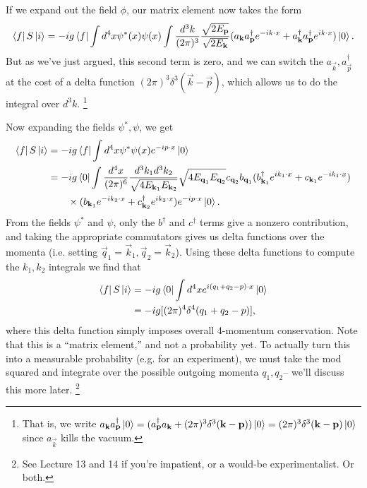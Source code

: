 If we expand out the field $\phi$, our matrix element now takes the form
\begin{equation}
    \left< f \right|S\left| i \right>=-ig \left< f \right| \int d^4x \psi^*(x) \psi(x)\int \frac{d^3k}{(2\pi)^3}\frac{\sqrt{2E_{\boldsymbol{\mathbf{p}}}}}{\sqrt{2E_{\boldsymbol{\mathbf{k}}}}}(a_{\boldsymbol{\mathbf{k}}} a_{\boldsymbol{\mathbf{p}}}^\dagger e^{-ik\cdot x}+a_{\boldsymbol{\mathbf{k}}}^\dagger a_{\boldsymbol{\mathbf{p}}}^\dagger e^{ik\cdot x})\left| 0 \right>.
\end{equation}
But as we've just argued, this second term is zero, and we can switch the $a_{\vec k}, a_{\vec p}^\dagger$ at the cost of a delta function $(2\pi)^3 \delta^3(\vec k -\vec p)$, which allows us to do the integral over $d^3k$.%
    \footnote{That is, we write $a_{\boldsymbol{\mathbf{k}}} a_{\boldsymbol{\mathbf{p}}}^\dagger \left| 0 \right>=(a_{\boldsymbol{\mathbf{p}}}^\dagger a_{\boldsymbol{\mathbf{k}}} +(2\pi)^3 \delta^3(\boldsymbol{\mathbf{k}}-\boldsymbol{\mathbf{p}}))\left| 0 \right>=(2\pi)^3 \delta^3(\boldsymbol{\mathbf{k}}-\boldsymbol{\mathbf{p}})\left| 0 \right>$ since $a_{\vec k}$ kills the vacuum.}
    
Now expanding the fields $\psi^*, \psi$, we get
\begin{align*}
    \left< f \right|S\left| i \right> &= -ig\left< f \right| \int d^4x \psi^* \psi(x)e^{-ip\cdot x}\left| 0 \right>\\
    &= -ig \left< 0 \right| \int \frac{d^4x}{(2\pi)^6} 
        \frac{d^3k_1 d^3k_2}{\sqrt{4E_{\boldsymbol{\mathbf{k}}_1}E_{\boldsymbol{\mathbf{k}}_2}}} \sqrt{4E_{\boldsymbol{\mathbf{q}}_1}E_{\boldsymbol{\mathbf{q}}_2}} c_{\boldsymbol{\mathbf{q}}_2}b_{\boldsymbol{\mathbf{q}}_1} 
        (b_{\boldsymbol{\mathbf{k}}_1}^\dagger e^{ik_1\cdot x}+c_{\boldsymbol{\mathbf{k}}_1} e^{-ik_1 \cdot x})\\
    &{} \qquad \times(b_{\boldsymbol{\mathbf{k}}_1} e^{-ik_2\cdot x}+c_{\boldsymbol{\mathbf{k}}_2}^\dagger e^{ik_2 \cdot x})e^{-ip\cdot x} \left| 0 \right>.
\end{align*}
From the fields $\psi^*$ and $\psi$, only the $b^\dagger$ and $c^\dagger$ terms give a nonzero contribution, and taking the appropriate commutators gives us delta functions over the momenta (i.e. setting $\vec q_1 = \vec k_1,\vec q_2=\vec k_2$). Using these delta functions to compute the $k_1,k_2$ integrals we find that
\begin{align*}
\left< f \right|S\left| i \right>&=-ig\left< 0 \right|\int d^4x e^{i(q_1+q_2-p)\cdot x}\left| 0 \right>\\
&=-ig[(2\pi)^4\delta^4(q_1+q_2-p)],
\end{align*}
where this delta function simply imposes overall 4-momentum conservation. Note that this is a ``matrix element,'' and not a probability yet. To actually turn this into a measurable probability (e.g. for an experiment), we must take the mod squared and integrate over the possible outgoing momenta $q_1,q_2$-- we'll discuss this more later.%
    \footnote{See Lecture 13 and 14 if you're impatient, or a would-be experimentalist. Or both.}

